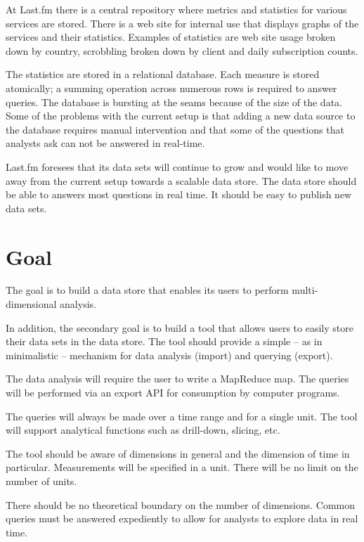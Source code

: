 At Last.fm there is a central repository where metrics and statistics for
various services are stored. There is a web site for internal use that
displays graphs of the services and their statistics. Examples of statistics
are web site usage broken down by country, scrobbling broken down by client
and daily subscription counts.

The statistics are stored in a relational database. Each measure is stored
atomically; a summing operation across numerous rows is required to answer
queries. The database is bursting at the seams because of the size of the
data. Some of the problems with the current setup is that adding a new data
source to the database requires manual intervention and that some of the
questions that analysts ask can not be answered in real-time.

Last.fm foresees that its data sets will continue to grow and would like to
move away from the current setup towards a scalable data store. The data store
should be able to answers most questions in real time. It should be easy
to publish new data sets.


\section{Goal}


The goal is to build a data store that enables its users to perform
multi-dimensional analysis.

In addition, the secondary goal is to build a tool that allows users to easily
store their data sets in the data store. The tool should provide a simple – as
in minimalistic – mechanism for data analysis (import) and querying (export).

The data analysis will require the user to write a MapReduce map. The queries
will be performed via an export API for consumption by computer programs.

The queries will always be made over a time range and for a single unit. The
tool will support analytical functions such as drill-down, slicing, etc.

The tool should be aware of dimensions in general and the dimension of time in
particular. Measurements will be specified in a unit. There will be no limit
on the number of units.

There should be no theoretical boundary on the number of dimensions. Common
queries must be answered expediently to allow for analysts to explore data in
real time.



